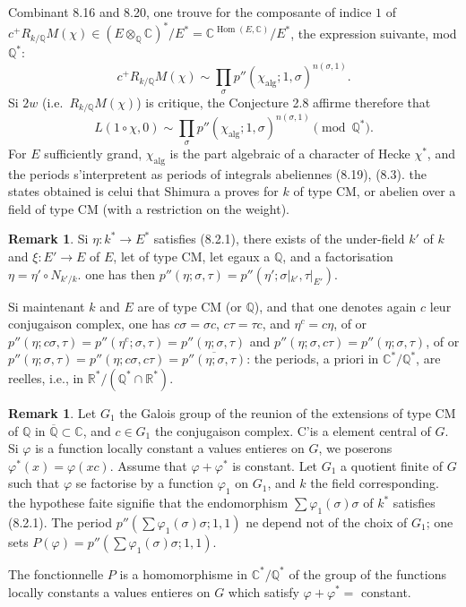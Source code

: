 \documentclass[12pt,a4paper]{article}
\theoremstyle{plain}
\theoremstyle{definition}
\newtheorem{remark}[definition]{Remark}
\theoremstyle{remark}
\DeclareMathOperator{\Hom}{Hom}
\newcommand{\Q}{\mathbb{Q}}
\newcommand{\R}{\mathbb{R}}
\newcommand{\C}{\mathbb{C}}
\begin{document}
Combinant 8.16 and 8.20, one trouve for the composante of indice $1$ of
$c^+ R_{k/\Q} M(\chi) \in (E \otimes_\Q \C)^*/E^* = \C^{\Hom(E,\C)}/E^*$, the expression suivante,
mod $\Q^*$:
\[
c^+ R_{k/\Q} M(\chi) \sim \prod_\sigma p''(\chi_{\text{alg}}; 1, \sigma)^{n(\sigma,1)}.
\]
Si $2w$ (i.e.~$R_{k/\Q} M(\chi)$) is critique, the Conjecture 2.8 affirme therefore that
\[
L(1 \circ \chi, 0) \sim \prod_\sigma p''(\chi_{\text{alg}}; 1, \sigma)^{n(\sigma,1)} \pmod{\Q^*}.
\]
For $E$ sufficiently grand, $\chi_{\text{alg}}$ is the part algebraic of a character of Hecke $\chi^*$,
and the periods s'interpretent as periods of integrals abeliennes (8.19), (8.3).
the states obtained is celui that Shimura a proves for $k$ of type CM, or abelien over a field of type CM (with a restriction on the weight).

\begin{remark}
Si $\eta: k^* \to E^*$ satisfies (8.2.1), there exists of the under-field $k'$ of $k$ and
$\xi: E' \to E$ of $E$, let of type CM, let egaux a $\Q$, and a factorisation
$\eta = \eta' \circ N_{k'/k}$. one has then $p''(\eta; \sigma, \tau) = p''(\eta'; \sigma|_{k'}, \tau|_{E'})$.

Si maintenant $k$ and $E$ are of type CM (or $\Q$), and that one denotes again $c$ leur
conjugaison complex, one has $c\sigma = \sigma c$, $c\tau = \tau c$, and $\eta^c = c\eta$, of or
$p''(\eta; c\sigma, \tau) = p''(\eta^c; \sigma, \tau) = p''(\eta; \sigma, \tau)$ and $p''(\eta; \sigma, c\tau) =
p''(\eta; \sigma, \tau)$, of or $p''(\eta; \sigma, \tau) = p''(\eta; c\sigma, c\tau) =
\overline{p''(\eta; \sigma, \tau)}$: the periods, a priori in $\C^*/\Q^*$, are reelles, i.e.,
in $\R^*/(\Q^* \cap \R^*)$.
\end{remark}

\begin{remark}
Let $G_1$ the Galois group of the reunion of the extensions of type CM of $\Q$
in $\overline{\Q} \subset \C$, and $c \in G_1$ the conjugaison complex. C'is a element central
of $G$. Si $\varphi$ is a function locally constant a values entieres on $G$, we
poserons $\varphi^*(x) = \varphi(xc)$. Assume that $\varphi + \varphi^*$ is constant. Let $G_1$ a
quotient finite of $G$ such that $\varphi$ se factorise by a function $\varphi_1$ on $G_1$, and $k$ the field
corresponding. the hypothese faite signifie that the endomorphism $\sum \varphi_1(\sigma) \sigma$
of $k^*$ satisfies (8.2.1). The period $p''(\sum \varphi_1(\sigma) \sigma; 1, 1)$ ne depend not of the choix
of $G_1$; one sets $P(\varphi) = p''(\sum \varphi_1(\sigma) \sigma; 1, 1)$.

The fonctionnelle $P$ is a homomorphisme in $\C^*/\Q^*$ of the group of the
functions locally constants a values entieres on $G$ which satisfy
$\varphi + \varphi^* =$ constant.
\end{remark}
\end{document}
